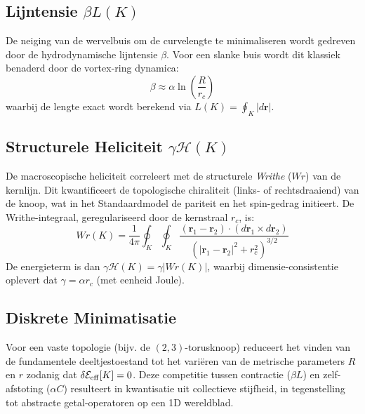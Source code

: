 \documentclass[12pt,a4paper]{article}
\begin{document}
                    \subsection{Lijntensie $\beta L(K)$}
                        De neiging van de wervelbuis om de curvelengte te minimaliseren wordt gedreven door de hydrodynamische lijntensie $\beta$. Voor een slanke buis wordt dit klassiek benaderd door de vortex-ring dynamica:
                        \begin{equation}
                            \beta \approx \alpha \ln\left(\frac{R}{r_c}\right)
                        \end{equation}
                        waarbij de lengte exact wordt berekend via $L(K) = \oint_K |d\mathbf{r}|$.
                    
                    \subsection{Structurele Heliciteit $\gamma \mathcal{H}(K)$}
                        De macroscopische heliciteit correleert met de structurele \textit{Writhe} ($Wr$) van de kernlijn. Dit kwantificeert de topologische chiraliteit (links- of rechtsdraaiend) van de knoop, wat in het Standaardmodel de pariteit en het spin-gedrag initieert. De Writhe-integraal, geregulariseerd door de kernstraal $r_c$, is:
                        \begin{equation}
                            Wr(K) = \frac{1}{4\pi} \oint_K \oint_K \frac{(\mathbf{r}_1 - \mathbf{r}_2) \cdot (d\mathbf{r}_1 \times d\mathbf{r}_2)}{\left(|\mathbf{r}_1 - \mathbf{r}_2|^2 + r_c^2\right)^{3/2}}
                        \end{equation}
                        De energieterm is dan $\gamma \mathcal{H}(K) = \gamma |Wr(K)|$, waarbij dimensie-consistentie oplevert dat $\gamma = \alpha r_c$ (met eenheid Joule).
                    
                    \subsection{Diskrete Minimatisatie}
                        Voor een vaste topologie (bijv. de $(2,3)$-torusknoop) reduceert het vinden van de fundamentele deeltjestoestand tot het vari\"eren van de metrische parameters $R$ en $r$ zodanig dat $\delta \mathcal{E}_{\rm eff}[K] = 0$. Deze competitie tussen contractie ($\beta L$) en zelf-afstoting ($\alpha C$) resulteert in kwantisatie uit collectieve stijfheid, in tegenstelling tot abstracte getal-operatoren op een 1D wereldblad.
            
\end{document}
